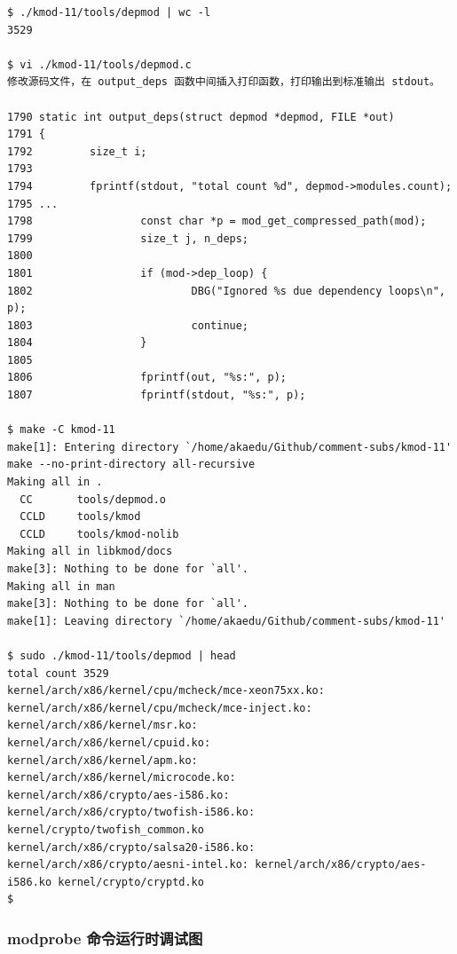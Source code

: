\documentclass[11pt,a4paper]{article}
\begin{document}
{\begin{shaded}\begin{verbatim}
$ ./kmod-11/tools/depmod | wc -l
3529

$ vi ./kmod-11/tools/depmod.c
修改源码文件，在 output_deps 函数中间插入打印函数，打印输出到标准输出 stdout。

1790 static int output_deps(struct depmod *depmod, FILE *out)
1791 {
1792         size_t i;
1793 
1794         fprintf(stdout, "total count %d", depmod->modules.count);
1795 ...
1798                 const char *p = mod_get_compressed_path(mod);
1799                 size_t j, n_deps;
1800 
1801                 if (mod->dep_loop) {
1802                         DBG("Ignored %s due dependency loops\n", p);
1803                         continue;
1804                 }
1805 
1806                 fprintf(out, "%s:", p);
1807                 fprintf(stdout, "%s:", p);

$ make -C kmod-11
make[1]: Entering directory `/home/akaedu/Github/comment-subs/kmod-11'
make --no-print-directory all-recursive
Making all in .
  CC       tools/depmod.o
  CCLD     tools/kmod
  CCLD     tools/kmod-nolib
Making all in libkmod/docs
make[3]: Nothing to be done for `all'.
Making all in man
make[3]: Nothing to be done for `all'.
make[1]: Leaving directory `/home/akaedu/Github/comment-subs/kmod-11'

$ sudo ./kmod-11/tools/depmod | head
total count 3529
kernel/arch/x86/kernel/cpu/mcheck/mce-xeon75xx.ko:
kernel/arch/x86/kernel/cpu/mcheck/mce-inject.ko:
kernel/arch/x86/kernel/msr.ko:
kernel/arch/x86/kernel/cpuid.ko:
kernel/arch/x86/kernel/apm.ko:
kernel/arch/x86/kernel/microcode.ko:
kernel/arch/x86/crypto/aes-i586.ko:
kernel/arch/x86/crypto/twofish-i586.ko: kernel/crypto/twofish_common.ko
kernel/arch/x86/crypto/salsa20-i586.ko:
kernel/arch/x86/crypto/aesni-intel.ko: kernel/arch/x86/crypto/aes-i586.ko kernel/crypto/cryptd.ko
$ 
\end{verbatim}\end{shaded}}
\subsubsection{modprobe 命令运行时调试图}
\end{document}
